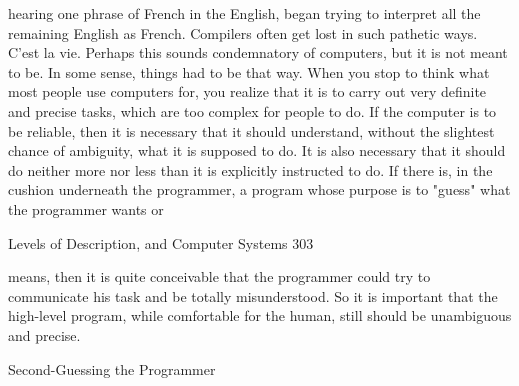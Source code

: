       hearing one phrase of French in the English, began trying to interpret all the
       remaining English as French. Compilers often get lost in such pathetic ways. C'est
       la vie.
       Perhaps this sounds condemnatory of computers, but it is not meant to be. In some
       sense, things had to be that way. When you stop to think what most people use
       computers for, you realize that it is to carry out very definite and precise tasks,
       which are too complex for people to do. If the computer is to be reliable, then it is
       necessary that it should understand, without the slightest chance of ambiguity,
       what it is supposed to do. It is also necessary that it should do neither more nor
       less than it is explicitly instructed to do. If there is, in the cushion underneath the
       programmer, a program whose purpose is to "guess" what the programmer wants
       or

Levels of Description, and Computer Systems                                               303

       means, then it is quite conceivable that the programmer could try to communicate
       his task and be totally misunderstood. So it is important that the high-level
       program, while comfortable for the human, still should be unambiguous and
       precise.

                               Second-Guessing the Programmer

